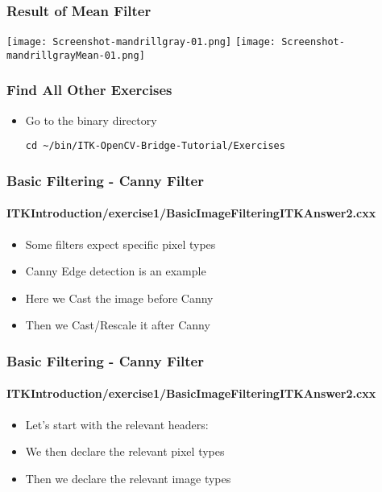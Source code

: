 \begin{frame}[fragile]
\frametitle{Result of Mean Filter}
\begin{center}
  \texttt{[image: Screenshot-mandrillgray-01.png]}
  \texttt{[image: Screenshot-mandrillgrayMean-01.png]}
\end{center}
\end{frame}

\begin{frame}[fragile]
\frametitle{Find All Other Exercises}
\begin{itemize}
\item Go to the binary directory
\begin{verbatim}
cd ~/bin/ITK-OpenCV-Bridge-Tutorial/Exercises
\end{verbatim}
\end{itemize}
\end{frame}

\begin{frame}
\frametitle{Basic Filtering - Canny Filter}
\framesubtitle{ITKIntroduction/exercise1/BasicImageFilteringITKAnswer2.cxx}
\begin{itemize}
\item Some filters expect specific pixel types
\pause
\item Canny Edge detection is an example
\pause
\item Here we Cast the image before Canny
\pause
\item Then we Cast/Rescale it after Canny
\end{itemize}
\end{frame}

\begin{frame}
\frametitle{Basic Filtering - Canny Filter}
\framesubtitle{ITKIntroduction/exercise1/BasicImageFilteringITKAnswer2.cxx}
\begin{itemize}
\item Let's start with the relevant headers:
\pause
{}
\pause
\item We then declare the relevant pixel types
\pause
{}
\pause
\item Then we declare the relevant image types
\pause
{}
\end{itemize}
\end{frame}

